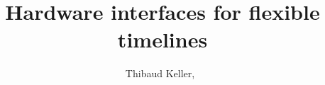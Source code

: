 \documentclass[journal,onecolumn]{IEEEtran}
\begin{document}
%
\title{Hardware interfaces for flexible timelines}
%
%
%

\author{Thibaud Keller,~}

% 
%
\end{document}
